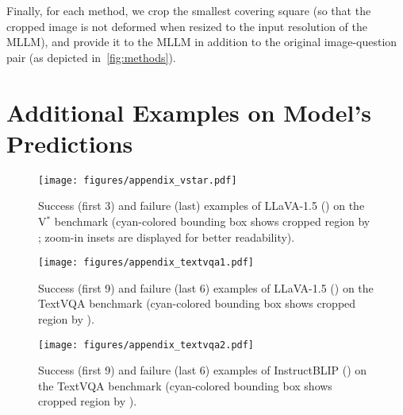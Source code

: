 Finally, for each method, we crop the smallest covering square (so that the cropped image is not deformed when resized to the input resolution of the MLLM), and provide it to the MLLM in addition to the original image-question pair (as depicted in~\cref{fig:methods}).

\clearpage
\section{Additional Examples on Model's Predictions}
\label{app:examples}


\begin{figure*}[h]
    \centering
    \texttt{[image: figures/appendix\_vstar.pdf]}
    \caption{Success (first 3) and failure (last) examples of LLaVA-1.5 (\rel{}) on the V$^*$ benchmark (cyan-colored bounding box shows cropped region by \rel{}; zoom-in insets are displayed for better readability).}
    \label{fig:example_llava_vstar}
\end{figure*}


\begin{figure*}[t]
    \centering
    \texttt{[image: figures/appendix\_textvqa1.pdf]}
    \caption{Success (first 9) and failure (last 6) examples of LLaVA-1.5 (\rel{}) on the TextVQA benchmark (cyan-colored bounding box shows cropped region by \rel{}).}
    \label{fig:example_llava_textvqa}
\end{figure*}

\begin{figure*}[t]
    \centering
    \texttt{[image: figures/appendix\_textvqa2.pdf]}
    \caption{Success (first 9) and failure (last 6) examples of InstructBLIP (\rel{}) on the TextVQA benchmark (cyan-colored bounding box shows cropped region by \rel{}).}
    \label{fig:example_instructblip_textvqa}
\end{figure*}
